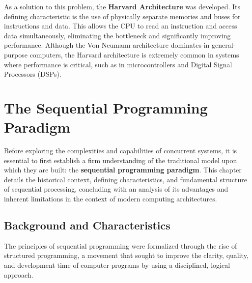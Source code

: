 As a solution to this problem, the \textbf{Harvard Architecture} was developed. Its defining characteristic is the use of physically separate memories and buses for instructions and data. This allows the CPU to read an instruction and access data simultaneously, eliminating the bottleneck and significantly improving performance. Although the Von Neumann architecture dominates in general-purpose computers, the Harvard architecture is extremely common in systems where performance is critical, such as in microcontrollers and Digital Signal Processors (DSPs).

\chapter{The Sequential Programming Paradigm}
\label{chap:sequential_paradigm}

Before exploring the complexities and capabilities of concurrent systems, it is essential to first establish a firm understanding of the traditional model upon which they are built: the \textbf{sequential programming paradigm}. This chapter details the historical context, defining characteristics, and fundamental structure of sequential processing, concluding with an analysis of its advantages and inherent limitations in the context of modern computing architectures.

\section{Background and Characteristics}
\label{sec:sequential_background}

The principles of sequential programming were formalized through the rise of structured programming, a movement that sought to improve the clarity, quality, and development time of computer programs by using a disciplined, logical approach.

